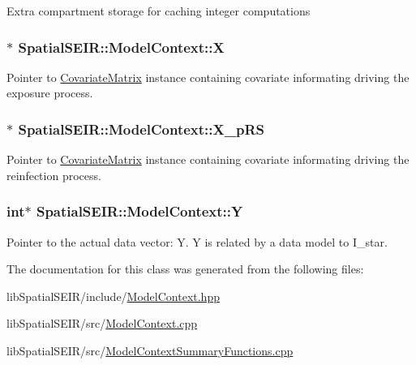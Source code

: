 Extra compartment storage for caching integer computations \hypertarget{classSpatialSEIR_1_1ModelContext_ab92eeb3b5c0ee046321578f1b7fccea3}{
\subsubsection[{X}]{$\ast$ Spatial\-S\-E\-I\-R\-::\-Model\-Context\-::\-X}}\label{classSpatialSEIR_1_1ModelContext_ab92eeb3b5c0ee046321578f1b7fccea3}
Pointer to \hyperlink{classSpatialSEIR_1_1CovariateMatrix}{Covariate\-Matrix} instance containing covariate informating driving the exposure process. \hypertarget{classSpatialSEIR_1_1ModelContext_ab4a6806ee81ecdd67ef14f40694a066c}{
\subsubsection[{X\-\_\-p\-R\-S}]{$\ast$ Spatial\-S\-E\-I\-R\-::\-Model\-Context\-::\-X\-\_\-p\-R\-S}}\label{classSpatialSEIR_1_1ModelContext_ab4a6806ee81ecdd67ef14f40694a066c}
Pointer to \hyperlink{classSpatialSEIR_1_1CovariateMatrix}{Covariate\-Matrix} instance containing covariate informating driving the reinfection process. \hypertarget{classSpatialSEIR_1_1ModelContext_a21143ccd9b787ff4a42c83cdb2b81a80}{
\subsubsection[{Y}]{\setlength{\rightskip}{0pt plus 5cm}int$\ast$ Spatial\-S\-E\-I\-R\-::\-Model\-Context\-::\-Y}}\label{classSpatialSEIR_1_1ModelContext_a21143ccd9b787ff4a42c83cdb2b81a80}
Pointer to the actual data vector\-: Y. Y is related by a data model to I\-\_\-star. 

The documentation for this class was generated from the following files\-:\begin{DoxyCompactItemize}
\item 
lib\-Spatial\-S\-E\-I\-R/include/\hyperlink{ModelContext_8hpp}{Model\-Context.\-hpp}\item 
lib\-Spatial\-S\-E\-I\-R/src/\hyperlink{ModelContext_8cpp}{Model\-Context.\-cpp}\item 
lib\-Spatial\-S\-E\-I\-R/src/\hyperlink{ModelContextSummaryFunctions_8cpp}{Model\-Context\-Summary\-Functions.\-cpp}\end{DoxyCompactItemize}
